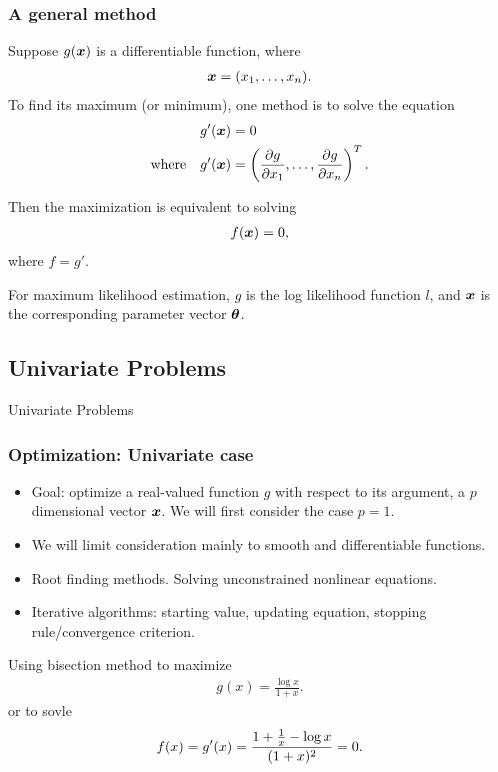   \begin{frame}
  \frametitle{A general method}
  Suppose $g(\boldsymbol{x})$ is a differentiable function, where
  \begin{align*}
    \boldsymbol{x} = ({x}_1, \ldots, {x}_{n}).
  \end{align*}
  To find its maximum (or minimum), one method is to solve the
  equation
  \begin{align*}
    g'(\boldsymbol{x})&=0  \\
    \text{where}\quad
    g'(\boldsymbol{x})& = \left(\frac{\partial g}{\partial x_1}, \ldots, \frac{\partial g}{\partial x_n}\right)\sp{T}.
  \end{align*}

  Then the maximization is equivalent to solving
  \begin{align*}
    f(\boldsymbol{x})=0,
  \end{align*}
  where $f = g'$.


  For maximum likelihood estimation, $g$ is the log likelihood function $l$, and $\boldsymbol{x}$ is the corresponding parameter vector $\boldsymbol{\theta}$.


  \end{frame}








\subsection{Univariate Problems}
\begin{frame}{}
\begin{block}{\center Univariate Problems}
\end{block}
\end{frame}


\begin{frame}
  \frametitle{Optimization: Univariate case}
  \begin{itemize}
    \item Goal: optimize a real-valued function $g$ with respect to its argument, a $p$ dimensional vector $\boldsymbol{x}$. We will first consider the case $p=1$.
    \item We will limit consideration mainly to smooth and differentiable functions.
    \item Root finding methods. Solving unconstrained nonlinear equations.
    \item Iterative algorithms: starting value, updating equation, stopping rule/convergence criterion.
  \end{itemize}


  Using bisection method to maximize
    \begin{align*}
      g(x) = \frac{\log x}{1+x}.
    \end{align*}
    or to sovle
    \begin{align*}
       f(x) = g'(x)=\frac{1+\frac{1}{x} - \log x}{(1+x)^2}=0.
    \end{align*}
\end{frame}

